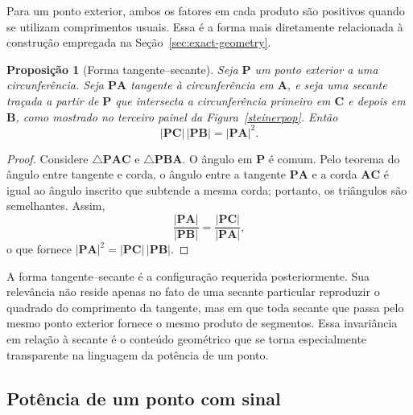 \documentclass[12pt,a4paper]{article}
\newcommand{\pt}[1]{\mathbf{#1}}
\newcommand{\seg}[1]{\mathbf{#1}}
\newcommand{\seglen}[1]{\lvert\mathbf{#1}\rvert}
\newcommand{\be}{\begin{equation}}
\newcommand{\ee}{\end{equation}}
\numberwithin{equation}{section}
\newtheorem{proposition}{Proposição}[section]
\theoremstyle{remark}
\begin{document}
Para um ponto exterior, ambos os fatores em cada produto são positivos quando se utilizam comprimentos usuais. Essa é a forma mais diretamente relacionada à construção empregada na Seção~\ref{sec:exact-geometry}.

\begin{proposition}[Forma tangente--secante]
\label{popsectan}
Seja $\pt{P}$ um ponto exterior a uma circunferência. Seja $\seg{PA}$ tangente à circunferência em $\pt{A}$, e seja uma secante traçada a partir de $\pt{P}$ que intersecta a circunferência primeiro em $\pt{C}$ e depois em $\pt{B}$, como mostrado no terceiro painel da Figura~\ref{steinerpop}. Então
\be
\seglen{PC}\,\seglen{PB}=\seglen{PA}^{2}.
\ee
\end{proposition}

\begin{proof}
Considere $\triangle \mathbf{PAC}$ e $\triangle \mathbf{PBA}$. O ângulo em $\pt{P}$ é comum. Pelo teorema do ângulo entre tangente e corda, o ângulo entre a tangente $\seg{PA}$ e a corda $\seg{AC}$ é igual ao ângulo inscrito que subtende a mesma corda; portanto, os triângulos são semelhantes. Assim,
\be
\frac{\seglen{PA}}{\seglen{PB}}=\frac{\seglen{PC}}{\seglen{PA}},
\ee
o que fornece $\seglen{PA}^{2}=\seglen{PC}\,\seglen{PB}$.
\end{proof}

A forma tangente--secante é a configuração requerida posteriormente. Sua relevância não reside apenas no fato de uma secante particular reproduzir o quadrado do comprimento da tangente, mas em que toda secante que passa pelo mesmo ponto exterior fornece o mesmo produto de segmentos. Essa invariância em relação à secante é o conteúdo geométrico que se torna especialmente transparente na linguagem da potência de um ponto.

\subsection{Potência de um ponto com sinal}
\end{document}

